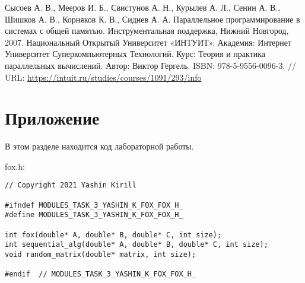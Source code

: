 \documentclass{report}
\begin{document}
\begin{thebibliography}{1}
Сысоев А. В., Мееров И. Б., Свистунов А. Н., Курылев А. Л., Сенин А. В., Шишков А. В., Корняков К. В.,
Сиднев А. А. Параллельное программирование в системах с общей памятью. Инструментальная поддержка, Нижний Новгород, 2007.
 Национальный Открытый Университет «ИНТУИТ». Академия: Интернет Университет Суперкомпьютерных Технологий. Курс: Теория и практика параллельных вычислений. Автор: Виктор Гергель. ISBN: 978-5-9556-0096-3. // URL: \url{https://intuit.ru/studies/courses/1091/293/info}
\end{thebibliography}
\newpage

\section*{Приложение}
В этом разделе находится код лабораторной работы.
\par fox.h:
\begin{lstlisting}
// Copyright 2021 Yashin Kirill

#ifndef MODULES_TASK_3_YASHIN_K_FOX_FOX_H_
#define MODULES_TASK_3_YASHIN_K_FOX_FOX_H_

int fox(double* A, double* B, double* C, int size);
int sequential_alg(double* A, double* B, double* C, int size);
void random_matrix(double* matrix, int size);

#endif  // MODULES_TASK_3_YASHIN_K_FOX_FOX_H_

\end{lstlisting}
\end{document}
